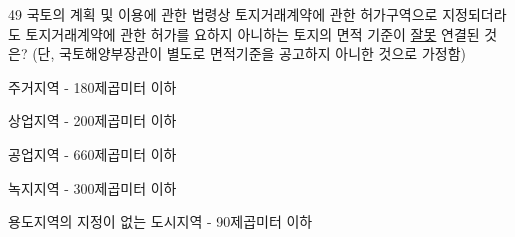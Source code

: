 \begin{question}{49}
국토의 계획 및 이용에 관한 법령상 토지거래계약에 관한 허가구역으로 지정되더라도 토지거래계약에 관한 허가를 요하지 아니하는 토지의 면적 기준이 \uline{잘못} 연결된 것은? (단, 국토해양부장관이 별도로 면적기준을 공고하지 아니한 것으로 가정함)
\begin{choices}
  \item 주거지역 - 180제곱미터 이하
  \item 상업지역 - 200제곱미터 이하
  \item 공업지역 - 660제곱미터 이하
  \item 녹지지역 - 300제곱미터 이하
  \item 용도지역의 지정이 없는 도시지역 - 90제곱미터 이하
\end{choices}
\end{question}
